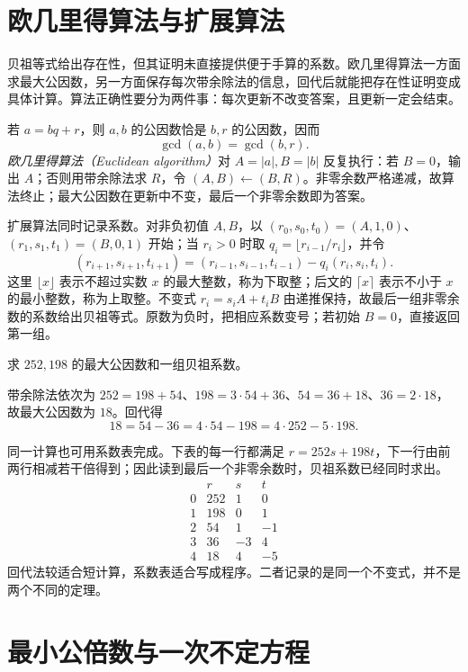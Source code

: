 \section{欧几里得算法与扩展算法}

贝祖等式给出存在性，但其证明未直接提供便于手算的系数。欧几里得算法一方面求最大公因数，另一方面保存每次带余除法的信息，回代后就能把存在性证明变成具体计算。算法正确性要分为两件事：每次更新不改变答案，且更新一定会结束。

若 $a=bq+r$，则 $a,b$ 的公因数恰是 $b,r$ 的公因数，因而
\[
  \gcd(a,b)=\gcd(b,r).
\]
\emph{欧几里得算法（Euclidean algorithm）}对 $A=|a|,B=|b|$ 反复执行：若 $B=0$，输出 $A$；否则用带余除法求 $R$，令 $(A,B)\leftarrow(B,R)$。非零余数严格递减，故算法终止；最大公因数在更新中不变，最后一个非零余数即为答案。

扩展算法同时记录系数。对非负初值 $A,B$，以 $(r_0,s_0,t_0)=(A,1,0)$、$(r_1,s_1,t_1)=(B,0,1)$ 开始；当 $r_i>0$ 时取 $q_i=\lfloor r_{i-1}/r_i\rfloor$，并令
\[
 (r_{i+1},s_{i+1},t_{i+1})
 =(r_{i-1},s_{i-1},t_{i-1})-q_i(r_i,s_i,t_i).
\]
这里 $\lfloor x\rfloor$ 表示不超过实数 $x$ 的最大整数，称为下取整；后文的 $\lceil x\rceil$ 表示不小于 $x$ 的最小整数，称为上取整。不变式 $r_i=s_iA+t_iB$ 由递推保持，故最后一组非零余数的系数给出贝祖等式。原数为负时，把相应系数变号；若初始 $B=0$，直接返回第一组。

\begin{example}
求 $252,198$ 的最大公因数和一组贝祖系数。
\end{example}
\begin{solve}
带余除法依次为 $252=198+54$、$198=3\cdot54+36$、$54=36+18$、$36=2\cdot18$，故最大公因数为 $18$。回代得
\[
 18=54-36=4\cdot54-198=4\cdot252-5\cdot198.
\]
\end{solve}

同一计算也可用系数表完成。下表的每一行都满足 $r=252s+198t$，下一行由前两行相减若干倍得到；因此读到最后一个非零余数时，贝祖系数已经同时求出。
\[
\begin{array}{c|r|r|r}
 &r&s&t\\\hline
0&252&1&0\\
1&198&0&1\\
2&54&1&-1\\
3&36&-3&4\\
4&18&4&-5
\end{array}
\]
回代法较适合短计算，系数表适合写成程序。二者记录的是同一个不变式，并不是两个不同的定理。

\section{最小公倍数与一次不定方程}


